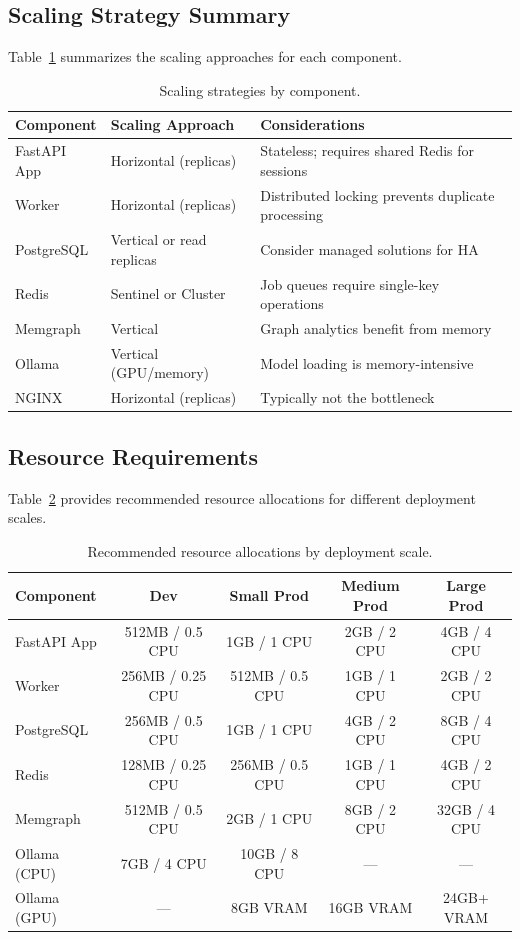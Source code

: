 \subsection{Scaling Strategy Summary}

Table~\ref{tab:scaling-strategies} summarizes the scaling approaches for each component.

\begin{table}[ht]
\centering
\caption{Scaling strategies by component.}
\label{tab:scaling-strategies}
\small
\begin{tabular}{lp{4cm}p{5cm}}
\hline
\textbf{Component} & \textbf{Scaling Approach} & \textbf{Considerations} \\
\hline
FastAPI App & Horizontal (replicas) & Stateless; requires shared Redis for sessions \\
Worker & Horizontal (replicas) & Distributed locking prevents duplicate processing \\
PostgreSQL & Vertical or read replicas & Consider managed solutions for HA \\
Redis & Sentinel or Cluster & Job queues require single-key operations \\
Memgraph & Vertical & Graph analytics benefit from memory \\
Ollama & Vertical (GPU/memory) & Model loading is memory-intensive \\
NGINX & Horizontal (replicas) & Typically not the bottleneck \\
\hline
\end{tabular}
\end{table}

\subsection{Resource Requirements}

Table~\ref{tab:resource-requirements} provides recommended resource allocations for different deployment scales.

\begin{table}[ht]
\centering
\caption{Recommended resource allocations by deployment scale.}
\label{tab:resource-requirements}
\small
\begin{tabular}{lcccc}
\hline
\textbf{Component} & \textbf{Dev} & \textbf{Small Prod} & \textbf{Medium Prod} & \textbf{Large Prod} \\
\hline
FastAPI App & 512MB / 0.5 CPU & 1GB / 1 CPU & 2GB / 2 CPU & 4GB / 4 CPU \\
Worker & 256MB / 0.25 CPU & 512MB / 0.5 CPU & 1GB / 1 CPU & 2GB / 2 CPU \\
PostgreSQL & 256MB / 0.5 CPU & 1GB / 1 CPU & 4GB / 2 CPU & 8GB / 4 CPU \\
Redis & 128MB / 0.25 CPU & 256MB / 0.5 CPU & 1GB / 1 CPU & 4GB / 2 CPU \\
Memgraph & 512MB / 0.5 CPU & 2GB / 1 CPU & 8GB / 2 CPU & 32GB / 4 CPU \\
Ollama (CPU) & 7GB / 4 CPU & 10GB / 8 CPU & --- & --- \\
Ollama (GPU) & --- & 8GB VRAM & 16GB VRAM & 24GB+ VRAM \\
\hline
\end{tabular}
\end{table}

